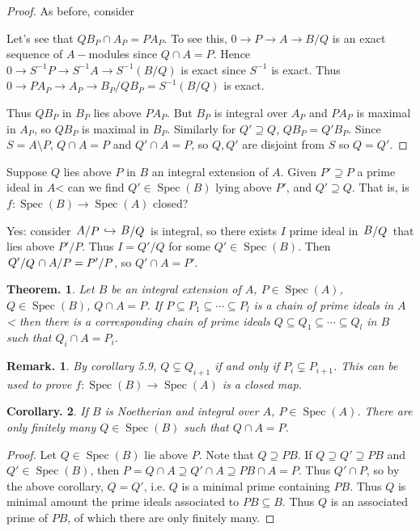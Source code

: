 \documentclass[11pt, a4paper]{memoir}
\newcommand{\lto}[0]{\ensuremath{\longrightarrow}}
\newcommand{\hto}[0]{\ensuremath{\hookrightarrow}}
\theoremstyle{change}
\newtheorem{theorem}{Theorem.}[section]
\newtheorem{corollary}[theorem]{Corollary.}
\theoremstyle{plain}
\theoremstyle{nonumberplain}
\newtheorem{remark}{Remark.}
\newtheorem{proof}{Proof}
\DeclareMathOperator{\Spec}{Spec}
\newcommand{\quot}[2]{\mathchoice{\left.\raisebox{0.10em}{$#1$}\middle/\raisebox{-0.10em}{$#2$}\right.}
                                 {\left.\raisebox{0.04em}{$#1$}\middle/\raisebox{-0.04em}{$#2$}\right.}
                                 {\left.\raisebox{0.01em}{$#1$}\middle/\raisebox{-0.01em}{$#2$}\right.}
                                 {\left.\raisebox{0em}{$#1$}\middle/\raisebox{0em}{$#2$}\right.}}
\numberwithin{equation}{section}
\begin{document}
\begin{proof}
    As before, consider
    \begin{center}
    \end{center}
    Let's see that $QB_P\cap A_P=PA_P$.
    To see this, $0\to P\to A\to B/Q$ is an exact sequence of $A-$modules since $Q\cap A=P$.
    Hence $0\lto S^{-1}P\lto S^{-1}A\lto S^{-1}(B/Q)$ is exact since $S^{-1}$ is exact.
    Thus $0\lto PA_P\lto A_P\lto B_P/QB_P=S^{-1}(B/Q)$ is exact.

    Thus $QB_P$ in $B_P$ lies above $PA_P$.
    But $B_P$ is integral over $A_P$ and $PA_P$ is maximal in $A_P$, so $QB_P$ is maximal in $B_P$.
    Similarly for $Q'\supseteq Q$, $QB_P=Q'B_P$.
    Since $S=A\setminus P$, $Q\cap A=P$ and $Q'\cap A=P$, so $Q,Q'$ are disjoint from $S$ so $Q=Q'$.
\end{proof}
Suppose $Q$ lies above $P$ in $B$ an integral extension of $A$.
Given $P'\supseteq P$ a prime ideal in $A$< can we find $Q'\in\Spec(B)$ lying above $P'$, and $Q'\supseteq Q$.
That is, is $f:\Spec(B)\to\Spec(A)$ closed?

Yes: consider $\quot{A}{P}\hto \quot{B}{Q}$ is integral, so there exists $I$ prime ideal in $\quot{B}{Q}$ that lies above $P'/P$.
Thus $I=Q'/Q$ for some $Q'\in\Spec(B)$.
Then $\quot{Q'}{Q}\cap A/P=P'/P$, so $Q'\cap A=P'$.
\begin{theorem}
    Let $B$ be an integral extension of $A$, $P\in\Spec(A)$, $Q\in\Spec(B)$, $Q\cap A=P$.
    If $P\subseteq P_1\subseteq\cdots\subseteq P_l$ is a chain of prime ideals in $A$< then there is a corresponding chain of prime ideals $Q\subseteq Q_1\subseteq\cdots\subseteq Q_l$ in $B$ such that $Q_i\cap A=P_i$.
\end{theorem}
\begin{remark}
    By corollary 5.9, $Q\subsetneq Q_{i+1}$ if and only if $P_i\subsetneq P_{i+1}$.
    This can be used to prove $f:\Spec(B)\to\Spec(A)$ is a closed map.
\end{remark}
\begin{corollary}
    If $B$ is Noetherian and integral over $A$, $P\in\Spec(A)$.
    There are only finitely many $Q\in\Spec(B)$ such that $Q\cap A=P$.
\end{corollary}
\begin{proof}
    Let $Q\in\Spec(B)$ lie above $P$.
    Note that $Q\supseteq PB$.
    If $Q\supseteq Q'\supseteq PB$ and $Q'\in\Spec(B)$, then $P=Q\cap A\supseteq Q'\cap A\supseteq PB\cap A=P$.
    Thus $Q'\cap P$, so by the above corollary, $Q=Q'$, i.e. $Q$ is a minimal prime containing $PB$.
    Thus $Q$ is minimal amount the prime ideals associated to $PB\subseteq B$.
    Thus $Q$ is an associated prime of $PB$, of which there are only finitely many.
\end{proof}
\end{document}
